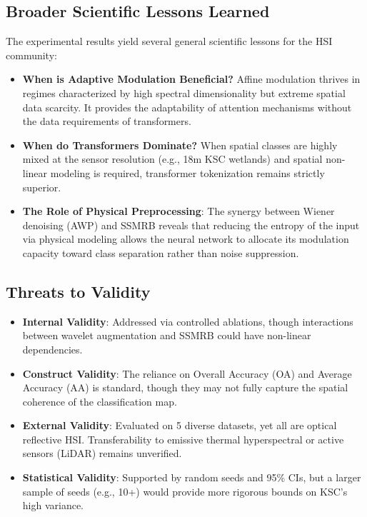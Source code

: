 \documentclass[conference]{IEEEtran}
\begin{document}
{{{{\subsection{Broader Scientific Lessons Learned}
The experimental results yield several general scientific lessons for the HSI community:
\begin{itemize}
    \item \textbf{When is Adaptive Modulation Beneficial?} Affine modulation thrives in regimes characterized by high spectral dimensionality but extreme spatial data scarcity. It provides the adaptability of attention mechanisms without the data requirements of transformers.
    \item \textbf{When do Transformers Dominate?} When spatial classes are highly mixed at the sensor resolution (e.g., 18m KSC wetlands) and spatial non-linear modeling is required, transformer tokenization remains strictly superior.
    \item \textbf{The Role of Physical Preprocessing}: The synergy between Wiener denoising (AWP) and SSMRB reveals that reducing the entropy of the input via physical modeling allows the neural network to allocate its modulation capacity toward class separation rather than noise suppression.
\end{itemize}

\subsection{Threats to Validity}
\begin{itemize}
    \item \textbf{Internal Validity}: Addressed via controlled ablations, though interactions between wavelet augmentation and SSMRB could have non-linear dependencies.
    \item \textbf{Construct Validity}: The reliance on Overall Accuracy (OA) and Average Accuracy (AA) is standard, though they may not fully capture the spatial coherence of the classification map.
    \item \textbf{External Validity}: Evaluated on 5 diverse datasets, yet all are optical reflective HSI. Transferability to emissive thermal hyperspectral or active sensors (LiDAR) remains unverified.
    \item \textbf{Statistical Validity}: Supported by random seeds and 95\% CIs, but a larger sample of seeds (e.g., 10+) would provide more rigorous bounds on KSC's high variance.
\end{itemize}

}}}}
\end{document}
